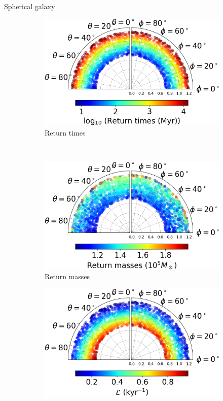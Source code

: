 \documentclass[handout]{beamer}
\begin{document}
\begin{frame}{Spherical galaxy}
	\begin{figure}[h]
		\centering
		\begin{subfigure}[t]{0.35\textwidth}
			\includegraphics[width = \textwidth]{"../Files/Week 13/images/10_slides_time"}
			\caption{Return times}
		\end{subfigure}
		~ 
		\begin{subfigure}[t]{0.35\textwidth}
			\includegraphics[width=\textwidth]{"../Files/Week 13/images/10_slides_mass"}
			\caption{Return masses}
		\end{subfigure}
		\begin{subfigure}[t]{0.35\textwidth}
			\includegraphics[width=\textwidth]{"../Files/Week 13/images/10_slides_lyapunov"}

\end{subfigure}
\end{figure}
\end{frame}
\end{document}

